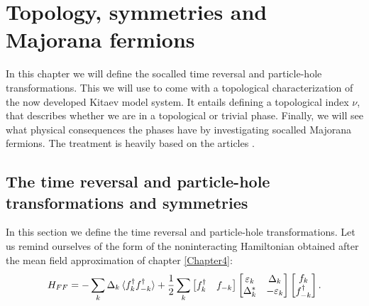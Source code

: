 
\chapter{Topology, symmetries and Majorana fermions} %

\label{Chapter7} %


In this chapter we will define the socalled time reversal and particle-hole transformations. This we will use to come with a topological characterization of the now developed Kitaev model system. It entails defining a topological index $\nu$, that describes whether we are in a topological or trivial phase. Finally, we will see what physical consequences the phases have by investigating socalled Majorana fermions. The treatment is heavily based on the articles \cite{Ludwig.Topology, Chiu.Topology, Alicea}. 

\section{The time reversal and particle-hole transformations and symmetries}
In this section we define the time reversal and particle-hole transformations. Let us remind ourselves of the form of the noninteracting Hamiltonian obtained after the mean field approximation of chapter \ref{Chapter4}: 
\begin{equation}
H_{FF} = -\sum_k \Delta_k \braket {f^\dagger_k f^\dagger_{-k}} + \frac{1}{2}\sum_{k} \begin{bmatrix} f^\dagger_k & f_{-k} \end{bmatrix} \begin{bmatrix} \varepsilon_k & \Delta_k \\ \Delta^*_k & -\varepsilon_k \end{bmatrix} \begin{bmatrix} f_k \\ f^\dagger_{-k} \end{bmatrix}. \nonumber 
\end{equation}

